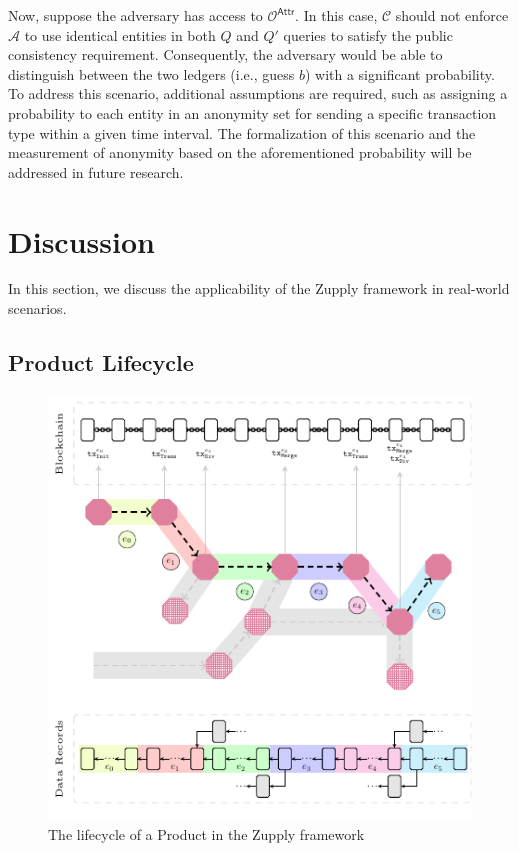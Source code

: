 Now, suppose the adversary has access to $\mathcal{O}^\mathsf{Attr}$. In this case, $\mathcal{C}$ should not enforce $\mathcal{A}$ to use identical entities in both $Q$ and $Q'$ queries to satisfy the public consistency requirement. Consequently, the adversary would be able to distinguish between the two ledgers (i.e., guess $b$) with a significant probability. 
To address this scenario, additional assumptions are required, such as assigning a probability to each entity in an anonymity set for sending a specific transaction type within a given time interval.
The formalization of this scenario and the measurement of anonymity based on the aforementioned probability will be addressed in future research.









\section{Discussion}

In this section, we discuss the applicability of the Zupply framework in real-world scenarios.

\subsection{Product Lifecycle}

\begin{figure}[h]
    \centering
    \includegraphics[width=.65\linewidth]{Figures/ZupplyNetwork}
    \caption{The lifecycle of a Product in the Zupply framework}
    \label{fig:enter-label}
\end{figure}

